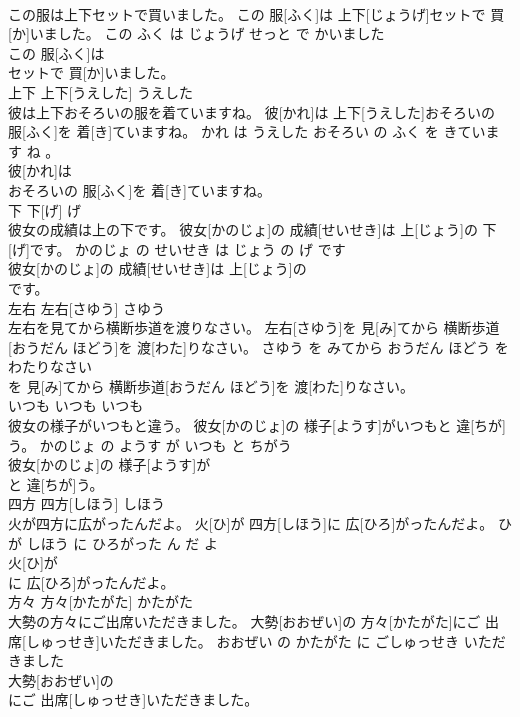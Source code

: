 \documentclass[8pt]{extreport}
\begin{document}
\begin{CJK}{UTF8}{min}
\\	この服は上下セットで買いました。	この 服[ふく]は 上下[じょうげ]セットで 買[か]いました。	この ふく は じょうげ せっと で かいました	
\\	この 服[ふく]は
\\	セットで 買[か]いました。			
\\	上下	上下[うえした]	うえした	
\\	彼は上下おそろいの服を着ていますね。	彼[かれ]は 上下[うえした]おそろいの 服[ふく]を 着[き]ていますね。	かれ は うえした おそろい の ふく を きています ね 。	
\\	彼[かれ]は
\\	おそろいの 服[ふく]を 着[き]ていますね。			
\\	下	下[げ]	げ	
\\	彼女の成績は上の下です。	彼女[かのじょ]の 成績[せいせき]は 上[じょう]の 下[げ]です。	かのじょ の せいせき は じょう の げ です	
\\	彼女[かのじょ]の 成績[せいせき]は 上[じょう]の
\\	です。			
\\	左右	左右[さゆう]	さゆう	
\\	左右を見てから横断歩道を渡りなさい。	左右[さゆう]を 見[み]てから 横断歩道[おうだん ほどう]を 渡[わた]りなさい。	さゆう を みてから おうだん ほどう を わたりなさい	
\\	を 見[み]てから 横断歩道[おうだん ほどう]を 渡[わた]りなさい。			
\\	いつも	いつも	いつも	
\\	彼女の様子がいつもと違う。	彼女[かのじょ]の 様子[ようす]がいつもと 違[ちが]う。	かのじょ の ようす が いつも と ちがう	
\\	彼女[かのじょ]の 様子[ようす]が
\\	と 違[ちが]う。			
\\	四方	四方[しほう]	しほう	
\\	火が四方に広がったんだよ。	火[ひ]が 四方[しほう]に 広[ひろ]がったんだよ。	ひ が しほう に ひろがった ん だ よ	
\\	火[ひ]が
\\	に 広[ひろ]がったんだよ。			
\\	方々	方々[かたがた]	かたがた	
\\	大勢の方々にご出席いただきました。	大勢[おおぜい]の 方々[かたがた]にご 出席[しゅっせき]いただきました。	おおぜい の かたがた に ごしゅっせき いただきました	
\\	大勢[おおぜい]の
\\	にご 出席[しゅっせき]いただきました。			

\end{CJK}
\end{document}
